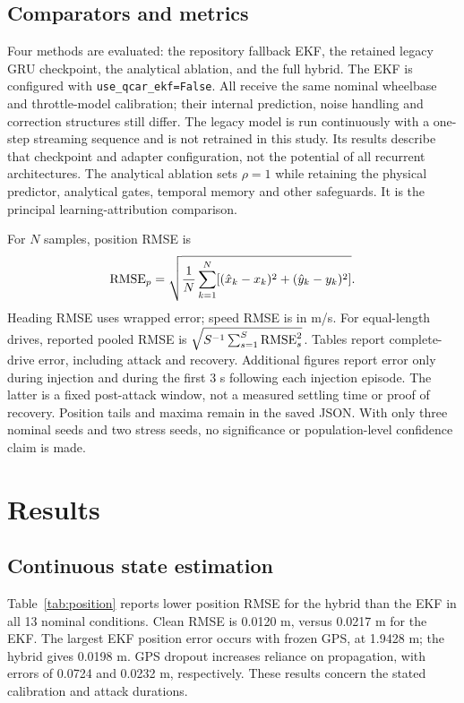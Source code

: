 ﻿\documentclass[10pt,a4paper]{article}
\begin{document}
\subsection{Comparators and metrics}
Four methods are evaluated: the repository fallback EKF, the retained legacy GRU
checkpoint, the analytical ablation, and the full hybrid.
The EKF is configured with \texttt{use\_qcar\_ekf=False}.
All receive the same nominal wheelbase and throttle-model calibration; their internal
prediction, noise handling and correction structures still differ.
The legacy model is run continuously with a one-step streaming sequence and is not
retrained in this study. Its results describe that checkpoint and adapter configuration,
not the potential of all recurrent architectures.
The analytical ablation sets $\rho=1$ while retaining the physical predictor, analytical
gates, temporal memory and other safeguards. It is the principal learning-attribution comparison.

For $N$ samples, position RMSE is
\begin{equation}
 {\rm RMSE}_{p}=
 \sqrt{\frac{1}{N}\sum_{k=1}^N
       [(\hat x_k-x_k)^2+(\hat y_k-y_k)^2]}.
 \label{eq:rmse}
\end{equation}
Heading RMSE uses wrapped error; speed RMSE is in m/s.
For equal-length drives, reported pooled RMSE is
$\sqrt{S^{-1}\sum_{s=1}^S{\rm RMSE}_s^2}$.
Tables report complete-drive error, including attack and recovery.
Additional figures report error only during injection and during the first 3 s following
each injection episode. The latter is a fixed post-attack window, not a measured settling
time or proof of recovery. Position tails and maxima remain in the saved JSON.
With only three nominal seeds and two stress seeds, no significance or population-level
confidence claim is made.

\section{Results}
\subsection{Continuous state estimation}
Table~\ref{tab:position} reports lower position RMSE for the hybrid than the EKF in all
13 nominal conditions. Clean RMSE is 0.0120 m, versus 0.0217 m for the EKF.
The largest EKF position error occurs with frozen GPS, at 1.9428 m; the hybrid gives
0.0198 m. GPS dropout increases reliance on propagation, with errors of 0.0724 and
0.0232 m, respectively. These results concern the stated calibration and attack durations.
\end{document}
